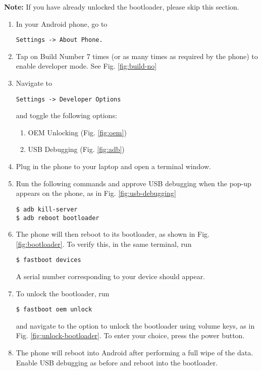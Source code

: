 \documentclass[journal,12pt,twocolumn]{IEEEtran}
\renewcommand\thesection{\arabic{section}}
\begin{document}
\textbf{Note:} If you have already unlocked the bootloader, please skip this
section.
\begin{enumerate}[label=\thesection.\arabic*
,ref=\thesection.\theenumi]
\item In your Android phone, go to 
\begin{lstlisting}
Settings -> About Phone.
\end{lstlisting}
\item Tap on Build Number 7 times (or as many times as required by the phone)
to enable developer mode. See Fig. \ref{fig:build-no}
\item Navigate to 
\begin{lstlisting}
Settings -> Developer Options
\end{lstlisting} 
and toggle the following options:
\begin{enumerate}
    \item OEM Unlocking (Fig. \ref{fig:oem})
    \item USB Debugging (Fig. \ref{fig:adb})
\end{enumerate}
\item Plug in the phone to your laptop and open a terminal window.
\item Run the following commands and approve USB debugging when the pop-up
appears on the phone, as in Fig. \ref{fig:usb-debugging}
\begin{lstlisting}
$ adb kill-server
$ adb reboot bootloader
\end{lstlisting}
\item The phone will then reboot to its bootloader, as shown in Fig. 
\ref{fig:bootloader}. To verify this, in the same terminal, run
\begin{lstlisting}
$ fastboot devices
\end{lstlisting}
A serial number corresponding to your device should appear.
\item To unlock the bootloader, run
\begin{lstlisting}
$ fastboot oem unlock
\end{lstlisting}
and navigate to the option to unlock the bootloader using volume keys, as in
Fig. \ref{fig:unlock-bootloader}. To enter your choice, press the power button.
\item The phone will reboot into Android after performing a full wipe of
the data. Enable USB debugging as before and reboot into the bootloader.
\end{enumerate}
\end{document}
